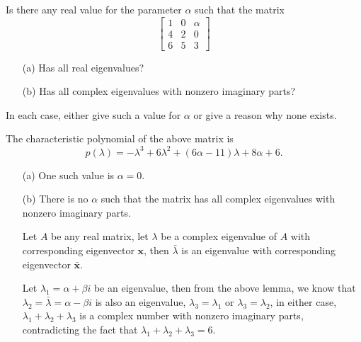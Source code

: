 \begin{pro}
  Is there any real value for the parameter $\alpha$ such that the matrix
  \begin{displaymath}
    \begin{bmatrix}
      1 & 0 & \alpha \\
      4 & 2 & 0 \\
      6 & 5 & 3
    \end{bmatrix}
  \end{displaymath}
  \begin{itemize}
  \item[(a)]
    Has all real eigenvalues?

  \item[(b)]
    Has all complex eigenvalues with nonzero imaginary parts?
  \end{itemize}
  In each case,
  either give such a value for $\alpha$ or
  give a reason why none exists.
\end{pro}

\begin{sol}
  The characteristic polynomial of the above matrix is
  \begin{displaymath}
    p(\lambda) = -\lambda^3 + 6\lambda^2 + (6\alpha-11)\lambda
    + 8\alpha+6.
  \end{displaymath}
  \begin{itemize}
  \item[(a)]
    One such value is $\alpha=0$.

  \item[(b)]
    There is no $\alpha$ such that the matrix has all complex eigenvalues
    with nonzero imaginary parts.
    \begin{lem}
      Let $A$ be any real matrix,
      let $\lambda$ be a complex eigenvalue of $A$ with corresponding
      eigenvector $\mathbf{x}$,
      then $\bar{\lambda}$ is an eigenvalue with corresponding eigenvector $\bar{\mathbf{x}}$.
    \end{lem}
    Let $\lambda_1=\alpha+\beta i$ be an eigenvalue,
    then from the above lemma,
    we know that $\lambda_2=\bar{\lambda}=\alpha-\beta i$ is also an eigenvalue,
    $\lambda_3=\lambda_1$ or $\lambda_3=\lambda_2$,
    in either case, $\lambda_1+\lambda_2+\lambda_3$ is a complex
    number with nonzero imaginary parts,
    contradicting the fact that $\lambda_1+\lambda_2+\lambda_3=6$.
  \end{itemize}
\end{sol}
